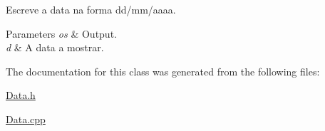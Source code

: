 Escreve a data na forma dd/mm/aaaa. 


\begin{DoxyParams}{Parameters}
{\em os} & Output. \\
\hline
{\em d} & A data a mostrar. \\
\hline
\end{DoxyParams}


The documentation for this class was generated from the following files\+:\begin{DoxyCompactItemize}
\item 
\hyperlink{_data_8h}{Data.\+h}\item 
\hyperlink{_data_8cpp}{Data.\+cpp}\end{DoxyCompactItemize}
